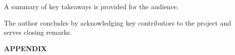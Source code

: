 \documentclass[pdftex,11pt,titlepage,twoside,openright]{report}
\begin{document}
A summary of key takeaways is provided for the audience.

The author concludes by acknowledging key contributors to the project and serves closing
remarks.


\ThinHRule

\newpage



{} %
\pagestyle{plain}






\newpage
{} %
\pagestyle{plain}
{\textbf{\LARGE{APPENDIX}}}\\	%

\end{document}
